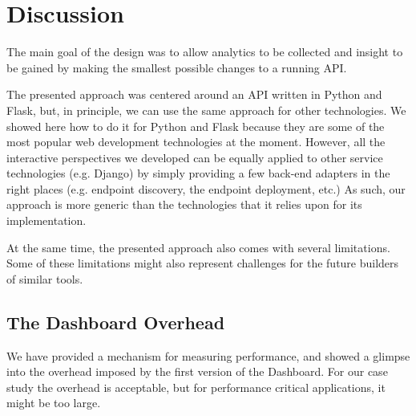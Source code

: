 
\section{Discussion}



  The main goal of the \tool design was to allow analytics to be collected and insight to be gained by making the smallest possible changes to a running API. 


  The presented approach was centered around an API written in Python and Flask, but, in principle, 
  we can use the same approach for other technologies. We showed here how to do it for Python and Flask because they are some of the most popular web development technologies at the moment. However,
  all the interactive perspectives we developed can be equally applied to other service technologies (e.g. Django) by simply providing a few back-end adapters in the right places (e.g. endpoint discovery, the  endpoint deployment, etc.)
  As such, our approach is more generic than the technologies that it relies upon for its implementation. 

  At the same time, the presented approach also comes with several limitations. Some of these limitations might also represent challenges for the future builders of similar tools.

  \subsection*{The Dashboard Overhead}

    We have provided a mechanism for measuring performance, and showed a glimpse into the overhead imposed by the first version of the Dashboard. For our case study the overhead is acceptable, but for performance critical applications, it might be too large. 

